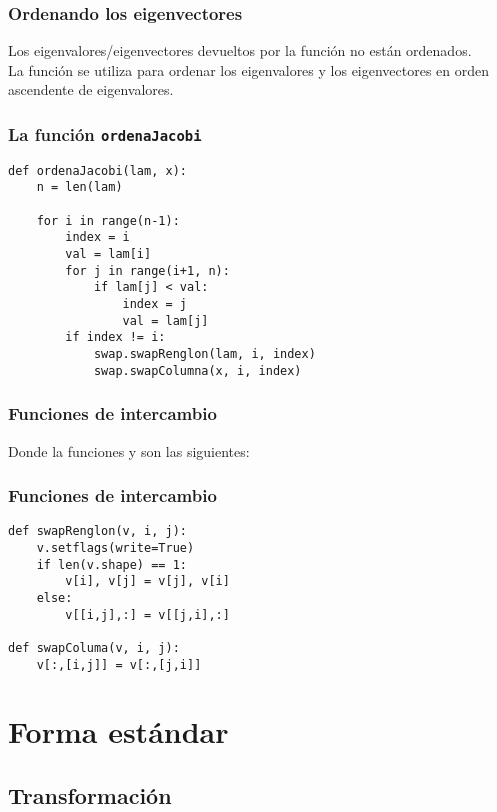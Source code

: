 \documentclass[12pt]{beamer}
\begin{document}
\begin{frame}
\frametitle{Ordenando los eigenvectores}
Los eigenvalores/eigenvectores devueltos por la función  no están ordenados.
\\
\bigskip
\pause
La función  se utiliza para ordenar los eigenvalores y los eigenvectores en orden ascendente de eigenvalores.
\end{frame}
\begin{frame}
\frametitle{La función \texttt{ordenaJacobi}}
\begin{lstlisting}[caption=La función para ordenar los eigenvalores y eigenvectores]
def ordenaJacobi(lam, x):
    n = len(lam)
    
    for i in range(n-1):
        index = i
        val = lam[i]
        for j in range(i+1, n):
            if lam[j] < val:
                index = j
                val = lam[j]
        if index != i:
            swap.swapRenglon(lam, i, index)
            swap.swapColumna(x, i, index)
\end{lstlisting}
\end{frame}
\begin{frame}
\frametitle{Funciones de intercambio}
Donde la funciones  y  son las siguientes:
\end{frame}
\begin{frame}[fragile]
\frametitle{Funciones de intercambio}
\begin{lstlisting}[caption=Funciones de intercambio de renglones y columnas]
def swapRenglon(v, i, j):
    v.setflags(write=True)
    if len(v.shape) == 1:
        v[i], v[j] = v[j], v[i]
    else:
        v[[i,j],:] = v[[j,i],:]
        
def swapColuma(v, i, j):
    v[:,[i,j]] = v[:,[j,i]]
\end{lstlisting}
\end{frame}

\section{Forma estándar}
\subsection{Transformación}
\end{document}
